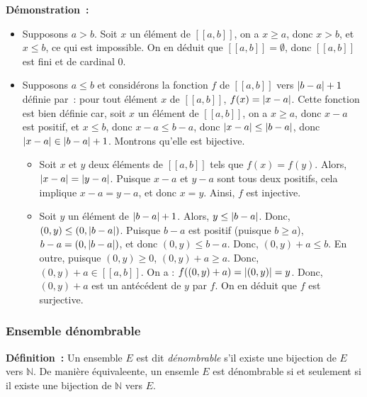 \noindent\textbf{Démonstration :}
    \begin{itemize}[nosep]
        \item Supposons $a > b$. 
            Soit $x$ un élément de $[\![a,b]\!]$, on a $x \geq a$, donc $x > b$, et $x \leq b$, ce qui est impossible.
            On en déduit que $[\![a, b]\!] = \emptyset$, donc $[\![a, b]\!]$ est fini et de cardinal $0$.
        \item Supposons $a \leq b$ et considérons la fonction $f$ de $[\![a, b]\!]$ vers $\left\lvert b-a \right\rvert+1$ définie par : pour tout élément $x$ de $[\![a, b]\!]$, $f(x) = \left\lvert x - a \right\rvert$. 
            Cette fonction est bien définie car, soit $x$ un élément de $[\![a, b]\!]$, on a $x \geq a$, donc $x - a$ est positif, et $x \leq b$, donc $x - a \leq b - a$, donc $\left\lvert x-a \right\rvert \leq \left\lvert b-a \right\rvert$, donc $\left\lvert x-a \right\rvert \in \left\lvert b-a \right\rvert + 1$. 
            Montrons qu'elle est bijective.
            \begin{itemize}[nosep]
                \item Soit $x$ et $y$ deux éléments de $[\![a, b]\!]$ tels que $f(x) = f(y)$.
                    Alors, $\left\lvert x-a \right\rvert = \left\lvert y-a \right\rvert$. 
                    Puisque $x-a$ et $y-a$ sont tous deux positifs, cela implique $x - a = y - a$, et donc $x = y$.
                    Ainsi, $f$ est injective.
                \item Soit $y$ un élément de $\left\lvert b-a \right\rvert+1$. 
                    Alors, $y \leq \left\lvert b-a \right\rvert$. 
                    Donc, $(0,y) \leq (0, \left\lvert b-a \right\rvert)$. 
                    Puisque $b-a$ est positif (puisque $b \geq a$), $b - a = (0, \left\lvert b-a \right\rvert)$, et donc $(0, y) \leq b-a$.
                    Donc, $(0, y) + a \leq b$.
                    En outre, puisque $(0,y) \geq 0$, $(0,y) + a \geq a$.
                    Donc, $(0,y)+a \in [\![a,b]\!]$.
                    On a  : $f((0,y)+a) = \left\lvert (0,y) \right\rvert = y$. 
                    Donc, $(0,y)+a$ est un antécédent de $y$ par $f$. 
                    On en déduit que $f$ est surjective.
            \end{itemize}
    \end{itemize}

    \hfill \square

\subsubsection{Ensemble dénombrable}

\noindent\textbf{Définition :} Un ensemble $E$ est dit \textit{dénombrable} s'il existe une bijection de $E$ vers $\mathbb{N}$. 
    De manière équivaleente, un ensemle $E$ est dénombrable si et seulement si il existe une bijection de $\mathbb{N}$ vers $E$.

